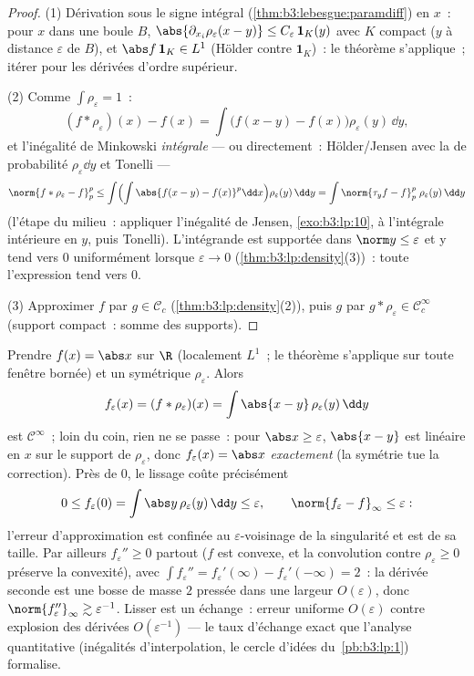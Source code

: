 \begin{proof}
(1) Dérivation sous le signe intégral
(\cref{thm:b3:lebesgue:paramdiff}) en $x$~: pour $x$ dans une
boule $B$, $\abs{\partial_{x_i}\rho_\varepsilon(x - y)} \leq
C_\varepsilon\,\mathbf 1_{K}(y)$ avec $K$ compact ($y$ à
distance $\varepsilon$ de $B$), et $\abs f\,\mathbf 1_K \in
L^1$ (Hölder contre $\mathbf 1_K$)~: le théorème s'applique~;
itérer pour les dérivées d'ordre supérieur.

(2) Comme $\int\rho_\varepsilon = 1$~:
\[
(f * \rho_\varepsilon)(x) - f(x)
= \int \bigl(f(x - y) - f(x)\bigr)\rho_\varepsilon(y)\,\dd y ,
\]
et l'inégalité de Minkowski \emph{intégrale} --- ou
directement~: Hölder/Jensen avec la  de probabilité
$\rho_\varepsilon\dd y$ et Tonelli ---
\[
\norm{f*\rho_\varepsilon - f}_p^p
\leq \int\Bigl(\int\abs{f(x-y) -
f(x)}^p\dd x\Bigr)\rho_\varepsilon(y)\,\dd y
= \int \norm{\tau_yf - f}_p^p\;\rho_\varepsilon(y)\,\dd y
\]
(l'étape du milieu~: appliquer l'inégalité de Jensen,
\cref{exo:b3:lp:10}, à l'intégrale intérieure en $y$, puis
Tonelli). L'intégrande est supportée dans $\norm y \leq
\varepsilon$ et y tend vers $0$ uniformément lorsque
$\varepsilon \to 0$ (\cref{thm:b3:lp:density}(3))~: toute
l'expression tend vers $0$.

(3) Approximer $f$ par $g \in \mathcal C_c$
(\cref{thm:b3:lp:density}(2)), puis $g$ par $g *
\rho_\varepsilon \in \mathcal C_c^\infty$ (support compact~:
somme des supports).
\end{proof}

\begin{example}
\label{ex:b3:lp:mollifyexample}
Prendre $f(x) = \abs x$ sur $\R$ (localement $L^1$~; le
théorème s'applique sur toute fenêtre bornée) et un
 symétrique $\rho_\varepsilon$. Alors
\[
f_\varepsilon(x) = (f * \rho_\varepsilon)(x)
= \int\abs{x - y}\,\rho_\varepsilon(y)\,\dd y
\]
est $\mathcal C^\infty$~; loin du coin, rien ne se passe~: pour
$\abs x \geq \varepsilon$, $\abs{x - y}$ est linéaire en $x$
sur le support de $\rho_\varepsilon$, donc $f_\varepsilon(x)
= \abs x$ \emph{exactement} (la symétrie tue la correction).
Près de $0$, le lissage coûte précisément
\[
0 \leq f_\varepsilon(0) = \int\abs
y\,\rho_\varepsilon(y)\,\dd y \leq \varepsilon,
\qquad
\norm{f_\varepsilon - f}_\infty \leq \varepsilon :
\]
l'erreur d'approximation est confinée au
$\varepsilon$-voisinage de la singularité et est de sa
taille. Par ailleurs $f_\varepsilon'' \geq 0$ partout ($f$
est convexe, et la convolution contre $\rho_\varepsilon \geq
0$ préserve la convexité), avec $\int f_\varepsilon'' =
f_\varepsilon'(\infty) - f_\varepsilon'(-\infty) = 2$~: la
dérivée seconde est une bosse de masse $2$ pressée dans une
largeur $O(\varepsilon)$, donc $\norm{f_\varepsilon''}_\infty
\gtrsim \varepsilon^{-1}$. Lisser est un échange~: erreur
uniforme $O(\varepsilon)$ contre explosion des dérivées
$O(\varepsilon^{-1})$ --- le taux d'échange exact que
l'analyse quantitative (inégalités d'interpolation, le cercle
d'idées du~\cref{pb:b3:lp:1}) formalise.
\end{example}

